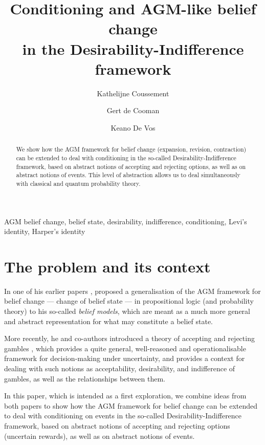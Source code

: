 \documentclass[preprint]{isipta2025}
\title{Conditioning and AGM-like belief change\\in the Desirability-Indifference framework}
\author[1]{Kathelijne Coussement}
\author[1]{Gert de Cooman}
\author[1]{Keano De Vos}
\affil[1]{Ghent University, Foundations Lab for imprecise probabilities, Ghent, Belgium}
\begin{document}
\maketitle


\begin{abstract}
We show how the AGM framework for belief change (expansion, revision, contraction) can be extended to deal with conditioning in the so-called Desirability-Indifference framework, based on abstract notions of accepting and rejecting options, as well as on abstract notions of events.
This level of abstraction allows us to deal simultaneously with classical and quantum probability theory.
\end{abstract}

\begin{keywords}
AGM belief change, belief state, desirability, indifference, conditioning, Levi's identity, Harper's identity
\end{keywords}


\section{The problem and its context}\label{sec::introduction}
In one of his earlier papers \cite{cooman2003a},  proposed a generalisation of the AGM framework for belief change --- change of belief state --- in propositional logic (and probability theory) \cite{gardenfors1988} to his so-called \emph{belief models}, which are meant as a much more general and abstract representation for what may constitute a belief state.

More recently, he and co-authors introduced a theory of accepting and rejecting gambles \cite{quaeghebeur2015:statement}, which provides a quite general, well-reasoned and operationalisable framework for decision-making under uncertainty, and provides a context for dealing with such notions as acceptability, desirability, and indifference of gambles, as well as the relationships between them.

In this paper, which is intended as a first exploration, we combine ideas from both papers to show how the AGM framework for belief change can be extended to deal with conditioning on events in the so-called Desirability-Indifference framework, based on abstract notions of accepting and rejecting options (uncertain rewards), as well as on abstract notions of events.
\end{document}
